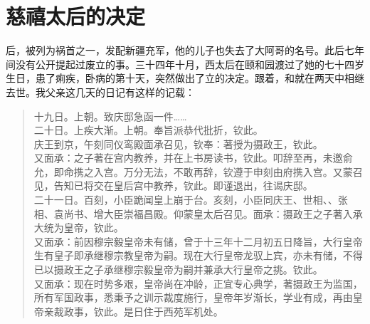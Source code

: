 \fancyhead[RO]{} %
\fancyhead[LE]{} %
\chapter*{慈禧太后的决定}
\thispagestyle{empty}
后，被列为祸首之一，发配新疆充军，他的儿子也失去了大阿哥的名号。此后七年间没有公开提起过废立的事。三十四年十月，西太后在颐和园渡过了她的七十四岁生日，患了痢疾，卧病的第十天，突然做出了立的决定。跟着，和就在两天中相继去世。我父亲这几天的日记有这样的记载：\\

\begin{quote}
	十九日。上朝。致庆邸急函一件……\\

二十日。上疾大渐。上朝。奉旨派恭代批折，钦此。\\

庆王到京，午刻同仪鸾殿面承召见，钦奉：著授为摄政王，钦此。\\

又面承：之子著在宫内教养，并在上书房读书，钦此。叩辞至再，未邀俞允，即命携之入宫。万分无法，不敢再辞，钦遵于申刻由府携入宫。又蒙召见，告知已将交在皇后宫中教养，钦此。即谨退出，往谒庆邸。\\

二十一日。百刻，小臣跪闻皇上崩于台。亥刻，小臣同庆王、世相、、张相、袁尚书、增大臣崇福昌殿。仰蒙皇太后召见。面承：摄政王之子著入承大统为皇帝，钦此。\\

又面承：前因穆宗毅皇帝未有储，曾于十三年十二月初五日降旨，大行皇帝生有皇子即承继穆宗教皇帝为嗣。现在大行皇帝龙驭上宾，亦未有储，不得已以摄政王之子承继穆宗毅皇帝为嗣并兼承大行皇帝之挑。钦此。\\

又面承：现在时势多艰，皇帝尚在冲龄，正宜专心典学，著摄政王为监国，所有军国政事，悉秉予之训示裁度施行，皇帝年岁渐长，学业有成，再由皇帝亲裁政事，钦此。是日住于西苑军机处。\\
\end{quote}

